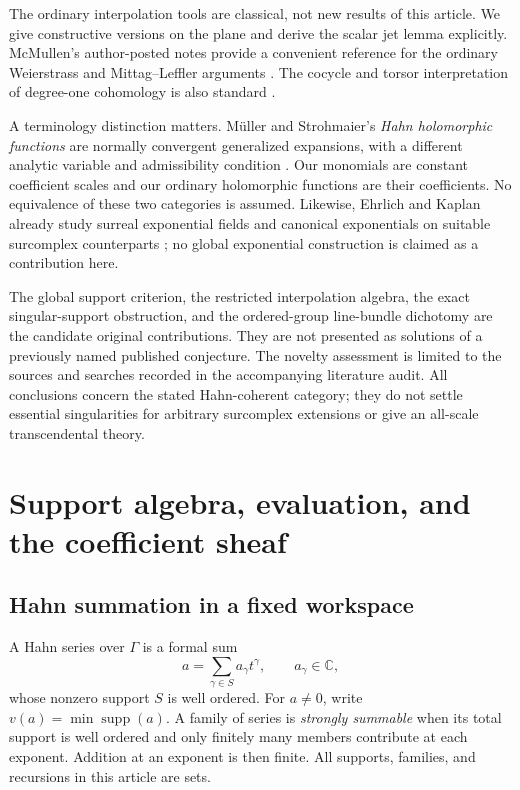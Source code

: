 \documentclass[11pt,letterpaper]{article}
\theoremstyle{definition}
\theoremstyle{remark}
\newcommand{\C}{\mathbb C}
\newcommand{\supp}{\operatorname{supp}}
\numberwithin{equation}{section}
\begin{document}
The ordinary interpolation tools are classical, not new results of this article. We give constructive versions on the plane and derive the scalar jet lemma explicitly. McMullen's author-posted notes provide a convenient reference for the ordinary Weierstrass and Mittag--Leffler arguments \cite[\S3]{McMullen}. The cocycle and torsor interpretation of degree-one cohomology is also standard \cite[Tag~02FQ]{Stacks}.

A terminology distinction matters. M\"uller and Strohmaier's \emph{Hahn holomorphic functions} are normally convergent generalized expansions, with a different analytic variable and admissibility condition \cite[Definitions~2.3 and~2.5]{MS}. Our monomials are constant coefficient scales and our ordinary holomorphic functions are their coefficients. No equivalence of these two categories is assumed. Likewise, Ehrlich and Kaplan already study surreal exponential fields and canonical exponentials on suitable surcomplex counterparts \cite{EK}; no global exponential construction is claimed as a contribution here.

The global support criterion, the restricted interpolation algebra, the exact singular-support obstruction, and the ordered-group line-bundle dichotomy are the candidate original contributions. They are not presented as solutions of a previously named published conjecture. The novelty assessment is limited to the sources and searches recorded in the accompanying literature audit. All conclusions concern the stated Hahn-coherent category; they do not settle essential singularities for arbitrary surcomplex extensions or give an all-scale transcendental theory.

\section{Support algebra, evaluation, and the coefficient sheaf}\label{sec:foundations}

\subsection{Hahn summation in a fixed workspace}
A Hahn series over $\Gamma$ is a formal sum
\[
 a=\sum_{\gamma\in S}a_\gamma t^\gamma,
 \qquad a_\gamma\in\C,
\]
whose nonzero support $S$ is well ordered. For $a\ne0$, write $v(a)=\min\supp(a)$. A family of series is \emph{strongly summable} when its total support is well ordered and only finitely many members contribute at each exponent. Addition at an exponent is then finite. All supports, families, and recursions in this article are sets.
\end{document}
